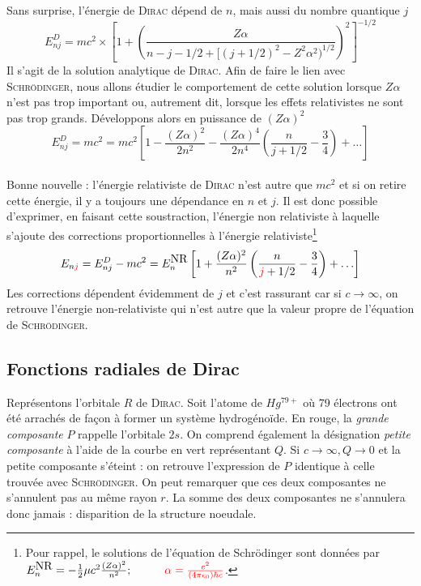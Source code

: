 Sans surprise, l'énergie de \textsc{Dirac} dépend de $n$, mais aussi du nombre quantique $j$
\begin{equation}
E_{nj}^D = mc^2\times \left[ 1 + 
\left(
\frac{Z \alpha} {n-j-1/2 + [(j+1/2)^2 - Z^2 \alpha^2)^{1/2}}
\right) ^2  \right] ^{-1/2}
\end{equation}
Il s'agit de la solution analytique de \textsc{Dirac}. Afin de faire le lien avec 
\textsc{Schrödinger}, nous allons étudier le comportement de cette solution lorsque $Z\alpha$ n'est
pas trop important ou, autrement dit, lorsque les effets relativistes ne sont pas trop grands. 
Développons alors en puissance de $(Z\alpha)^2$
\begin{equation}
E_{nj}^D = mc^2= mc^2 \left[
1 - \frac{(Z \alpha)^2}{2 n^2} 
- \frac{(Z \alpha)^4}{2n^4} \left(
\frac{n}{j+1/2} - \frac{3}{4} \right) + \ldots \right]
\end{equation}\ \\
Bonne nouvelle : l'énergie relativiste de \textsc{Dirac} n'est autre que $mc^2$ et si on retire cette
énergie, il y a toujours une dépendance en $n$ et $j$. Il est donc possible d'exprimer, en faisant
cette soustraction, l'énergie non relativiste à laquelle s'ajoute des corrections proportionnelles
à l'énergie relativiste\footnote{Pour rappel, le solutions de l'équation de Schrödinger sont 
données par $E_n^{\mbox{NR}} =
- \frac{1}{2} \mu c^2 \frac{(Z \alpha)^2}{n^2} ; \hspace*{1cm}
{\color{red} \alpha = \frac{e^2}{(4 \pi \epsilon_0) 
\hbar c}}$.}
\begin{equation}
E_{n {\color{red} j}} = E^D_{nj} - mc^2 = E_n^{\mbox{NR}} \left[
1 + \frac{(Z \alpha)^2}{n^2} \left(
\frac{n}{{\color{red} j}+1/2} - \frac{3}{4} \right) + \ldots \right]
\end{equation}
Les corrections dépendent évidemment de $j$ et c'est rassurant car si $c\to \infty$, on retrouve
l'énergie non-relativiste qui n'est autre que la valeur propre de l'équation de \textsc{Schrödinger}.


\subsection{Fonctions radiales de Dirac}
Représentons l'orbitale $R$ de \textsc{Dirac}. Soit l'atome de $Hg^{79+}$ où 79 électrons ont été
arrachés de façon à former un système hydrogénoïde. En rouge, la \textit{grande composante} $P$ 
rappelle l'orbitale $2s$. On comprend également la désignation \textit{petite composante} à l'aide
de la courbe en vert représentant $Q$. Si $c\to\infty, Q\to 0$ et la petite composante s'éteint : on
retrouve l'expression de $P$ identique à celle trouvée avec \textsc{Schrödinger}. On peut remarquer
que ces deux composantes ne s'annulent pas au même rayon $r$. La somme des deux composantes ne 
s'annulera donc jamais : disparition de la structure noeudale.\\


